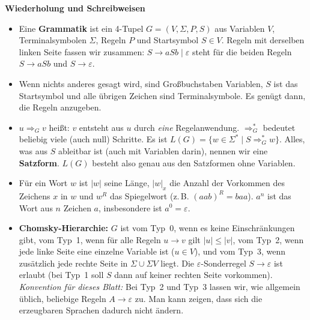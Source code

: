 \newcommand{\printpraesenzlsg}{false}
\newcommand{\printloesungen}{true}
\newcommand{\printbewertungen}{false}
\newcommand{\blattnummer}{5}


\newcommand{\tm}[1]{\mathtt{#1}}
\newcommand{\ko}{\mathord{\mathtt{,}}}


\iforiginal{}

\begin{notes}\small
\textbf{Wiederholung und Schreibweisen}
\begin{itemize}
  \item Eine \textbf{Grammatik} ist ein 4-Tupel $G=(V,\Sigma,P,S)$ aus Variablen $V$, Terminalsymbolen $\Sigma$, Regeln $P$ und Startsymbol $S\in V$. Regeln mit derselben linken Seite fassen wir zusammen: $S\to aSb\mid\varepsilon$ steht für die beiden Regeln $S\to aSb$ und $S\to\varepsilon$.
  \item Wenn nichts anderes gesagt wird, sind Großbuchstaben Variablen, $S$ ist das Startsymbol und alle übrigen Zeichen sind Terminalsymbole. Es genügt dann, die Regeln anzugeben.
  \item $u\Rightarrow_G v$ heißt: $v$ entsteht aus $u$ durch \emph{eine} Regelanwendung. $\Rightarrow^*_G$ bedeutet beliebig viele (auch null) Schritte. Es ist $L(G)=\{w\in\Sigma^*\mid S\Rightarrow^*_G w\}$. Alles, was aus $S$ ableitbar ist (auch mit Variablen darin), nennen wir eine \textbf{Satzform}. $L(G)$ besteht also genau aus den Satzformen ohne Variablen.
  \item Für ein Wort $w$ ist $|w|$ seine Länge, $|w|_x$ die Anzahl der Vorkommen des Zeichens $x$ in $w$ und $w^R$ das Spiegelwort (z.\,B. $(aab)^R=baa$). $a^n$ ist das Wort aus $n$ Zeichen $a$, insbesondere ist $a^0=\varepsilon$.
  \item \textbf{Chomsky-Hierarchie:} $G$ ist vom Typ~0, wenn es keine Einschränkungen gibt, vom Typ~1, wenn für alle Regeln $u\to v$ gilt $|u|\leq|v|$, vom Typ~2, wenn jede linke Seite eine einzelne Variable ist ($u\in V$), und vom Typ~3, wenn zusätzlich jede rechte Seite in $\Sigma\cup\Sigma V$ liegt. Die $\varepsilon$-Sonderregel $S\to\varepsilon$ ist erlaubt (bei Typ~1 soll $S$ dann auf keiner rechten Seite vorkommen). \emph{Konvention für dieses Blatt:} Bei Typ~2 und Typ~3 lassen wir, wie allgemein üblich, beliebige Regeln $A\to\varepsilon$ zu. Man kann zeigen, dass sich die erzeugbaren Sprachen dadurch nicht ändern.

\end{itemize}
\end{notes}
